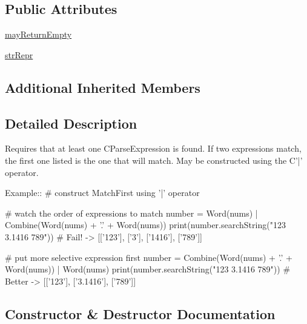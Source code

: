\subsection*{Public Attributes}
\begin{DoxyCompactItemize}
\item 
\hyperlink{classpkg__resources_1_1__vendor_1_1pyparsing_1_1MatchFirst_a9ab2320992630796ee7fdda75dbaeeeb}{may\+Return\+Empty}
\item 
\hyperlink{classpkg__resources_1_1__vendor_1_1pyparsing_1_1MatchFirst_ad83e15622522a01209dc770db5fe54e6}{str\+Repr}
\end{DoxyCompactItemize}
\subsection*{Additional Inherited Members}


\subsection{Detailed Description}
\begin{DoxyVerb}Requires that at least one C{ParseExpression} is found.
If two expressions match, the first one listed is the one that will match.
May be constructed using the C{'|'} operator.

Example::
    # construct MatchFirst using '|' operator
    
    # watch the order of expressions to match
    number = Word(nums) | Combine(Word(nums) + '.' + Word(nums))
    print(number.searchString("123 3.1416 789")) #  Fail! -> [['123'], ['3'], ['1416'], ['789']]

    # put more selective expression first
    number = Combine(Word(nums) + '.' + Word(nums)) | Word(nums)
    print(number.searchString("123 3.1416 789")) #  Better -> [['123'], ['3.1416'], ['789']]
\end{DoxyVerb}
 

\subsection{Constructor \& Destructor Documentation}
\mbox{\label{classpkg__resources_1_1__vendor_1_1pyparsing_1_1MatchFirst_acc3d30ea535be38efbcf99066d89209c}} 
